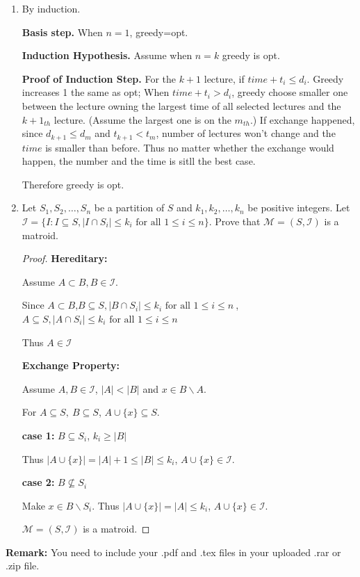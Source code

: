 \documentclass[12pt,a4paper]{article}
\makeatletter
\newtheorem*{solution}{Solution}
\theoremstyle{definition}
\renewenvironment{solution}[1][Solution] {\par\pushQED{\qed}\normalfont\topsep6\p@\@plus6\p@\relax\trivlist\item[\hskip\labelsep\bfseries#1\@addpunct{.}]\ignorespaces}{\popQED\endtrivlist\@endpefalse} \makeatother
\makeatother
\begin{document}
\begin{enumerate}
\begin{algorithm}
    \end{algorithm}
    
    \begin{solution}
        By induction.

        \textbf{Basis step.} When $n=1$, greedy=opt.

        \textbf{Induction Hypothesis.} Assume when $n=k$ greedy is opt.

        \textbf{Proof of Induction Step.} For the $k+1$ lecture, if $time+t_i\le d_i$. Greedy increases 1 the same as opt;
        When $time+t_i> d_i$, greedy choose smaller one between the lecture owning the largest time of all selected lectures and the $k+1_{th}$
        lecture. (Assume the largest one is on the $m_{th}$.) If exchange happened, since $d_{k+1}\le d_{m}$ and $t_{k+1}< t_m$, number of lectures
        won't change and the $time$ is smaller than before. Thus no matter whether the exchange would happen, the number and the time is sitll the best case.

        Therefore greedy is opt.
   \end{solution}

    \item
    Let $S_1,S_2,\dots,S_n$ be a partition of $S$ and $k_1,k_2,\dots,k_n$ be positive integers. Let $\mathcal{I}=\{I: I \subseteq S,|I \cap S_i| \leq k_i \text { for all } 1 \leq i \leq n\}$. Prove that $\mathcal{M}=(S,\mathcal{I})$ is a matroid.

    \begin{proof}
        
        \textbf{Hereditary:}

        Assume $A\subset B, B\in \mathcal{I}$.

        Since $A\subset B$,$B \subseteq S,|B \cap S_i| \leq k_i \text { for all } 1 \leq i \leq n\ $, $ A \subseteq S,|A \cap S_i| \leq k_i \text { for all } 1 \leq i \leq n\ $

        Thus $A\in \mathcal{I}$

        \textbf{Exchange Property:}

        Assume $A,B\in \mathcal{I}$, $|A|<|B|$ and $x\in B\backslash A$.

        For $A\subseteq S,\ B\subseteq S$, $A\cup \{ x \} \subseteq S.$
        
        \textbf{case 1:} $B\subseteq S_i$, $k_i\ge |B|$

        Thus $|A\cup \{ x\} |=|A|+1\le |B|\le k_i$, $A\cup \{ x\}\in \mathcal{I}$.

        \textbf{case 2:} $B \nsubseteq S_i$

        Make $x\in B\backslash S_i$. Thus $|A\cup \{ x\} |=|A|\le k_i$, $A\cup \{ x\}\in \mathcal{I}$.

        $\mathcal{M}=(S,\mathcal{I})$ is a matroid.

    \end{proof}

\end{enumerate}

\vspace{20pt}

\textbf{Remark:} You need to include your .pdf and .tex files in your uploaded .rar or .zip file.

\end{document}
